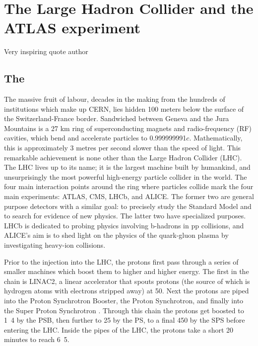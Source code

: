 \chapter{The Large Hadron Collider and the ATLAS experiment}
\label{chap:ATLASdetector}

{Very inspiring quote author}

\section{The \LHC}
\label{sec:LHCandATLAS}

The massive fruit of labour, decades in the making from the hundreds of institutions which make up CERN, lies hidden 100 meters below the surface of the Switzerland-France border. Sandwiched between Geneva and the Jura Mountains is a 27 km ring of superconducting magnets and radio-frequency (RF) cavities, which bend and accelerate particles to 0.999999991$c$. Mathematically, this is approximately 3 metres per second slower than the speed of light. This remarkable achievement is none other than the Large Hadron Collider (LHC). The LHC lives up to its name; it is the largest machine built by humankind, and unsurprisingly the most powerful high-energy particle collider in the world. The four main interaction points around the ring where particles collide mark the four main experiments: ATLAS, CMS, LHCb, and ALICE. The former two are general purpose detectors with a similar goal: to precisely study the Standard Model and to search for evidence of new physics. The latter two have specialized purposes. LHCb is dedicated to probing physics involving b-hadrons in pp collisions, and ALICE’s aim is to shed light on the physics of the quark-gluon plasma by investigating heavy-ion collisions. 

Prior to the injection into the LHC, the protons first pass through a series of smaller machines which boost them to higher and higher energy. The first in the chain is LINAC2, a linear accelerator that spouts protons (the source of which is hydrogen atoms with electrons stripped away) at \unit{50}{\MeV}. Next the protons are piped into the Proton Synchrotron Booster, the Proton Synchrotron, and finally into the Super Proton Synchrotron . Through this chain the protons get boosted to \unit{1.4}{\GeV} by the PSB, then further to \unit{25}{\GeV} by the PS, to a final \unit{450}{\GeV} by the SPS before entering the LHC. Inside the pipes of the LHC, the protons take a short 20 minutes to reach \unit{6.5}{\TeV}. 

